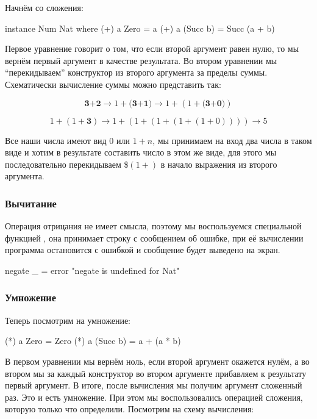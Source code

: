 Начнём со сложения:


\begin{code}
instance Num Nat where
    (+) a Zero     = a
    (+) a (Succ b) = Succ (a + b)
\end{code}

Первое уравнение говорит о том, что если второй аргумент равен нулю, то
мы вернём первый аргумент в качестве результата. Во втором уравнении мы
``перекидываем'' конструктор  из второго аргумента за пределы
суммы. Схематически вычисление суммы можно представить так:

\[\textbf{3+2} \rightarrow 1+\textbf{(3+1)} \rightarrow 1+(1+\textbf{(3+0)})\]

\[1+(1+\textbf{3}) \rightarrow 1+(1+(1+(1+(1+0)))) \rightarrow 5\]

Все наши числа имеют вид $0$ или $1+n$, мы принимаем на вход два числа в
таком виде и хотим в результате составить число в этом же виде, для
этого мы последовательно перекидываем \$$(1+)$ в начало выражения из
второго аргумента.

\subsubsection{Вычитание}

Операция отрицания не имеет смысла, поэтому мы воспользуемся специальной
функцией , она принимает строку с сообщением об
ошибке, при её вычислении программа остановится с ошибкой и сообщение
будет выведено на экран.


\begin{code}
    negate _ = error "negate is undefined for Nat"
\end{code}

\subsubsection{Умножение}

Теперь посмотрим на умножение:


\begin{code}
    (*) a Zero     = Zero
    (*) a (Succ b) = a + (a * b)     
\end{code}

В первом уравнении мы вернём ноль, если второй аргумент окажется нулём,
а во втором мы за каждый конструктор  во втором аргументе
прибавляем к результату первый аргумент. В итоге, после вычисления
 мы получим аргумент  сложенный  раз. Это и есть
умножение. При этом мы воспользовались операцией сложения, которую
только что определили. Посмотрим на схему вычисления:

